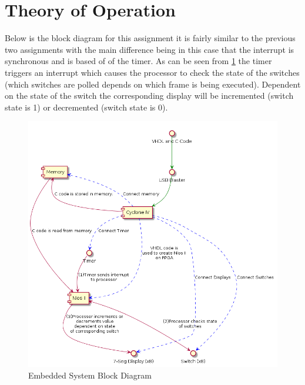 \documentclass[10pt,a4paper]{article}
\begin{document}
	\section{Theory of Operation}
	Below is the block diagram for this assignment it is fairly similar to the previous two assignments with the main difference being in this case that the interrupt is synchronous and is based of of the timer. As can be seen from \ref{block} the timer triggers an interrupt which causes the processor to check the state of the switches (which switches are polled depends on which frame is being executed). Dependent on the state of the switch the corresponding display will be incremented (switch state is 1) or decremented (switch state is 0).
	\begin{figure}[H]
		\centering\includegraphics[width=15cm]{HW3_Block.png}
		\caption{Embedded System Block Diagram}
		\label{block}
	\end{figure}
\end{document}
